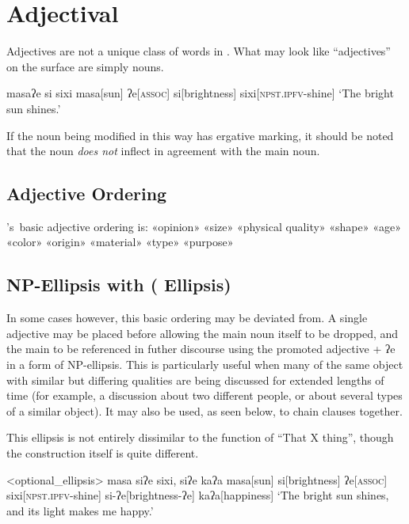 \chapter{Adjectival}\label{ch:adjectives}
Adjectives are not a unique class of words in \langname .
What may look like ``adjectives'' on the surface are simply nouns.

\ex
\begingl
\glpreamble masaʔe si sixi
\endpreamble
\nogloss{\lbrack}
masa[sun]
ʔe[\textsc{assoc}]
si[brightness]
\nogloss{\rbrack}
sixi[\textsc{npst.ipfv}-shine]
\glft `The bright sun shines.'
\endgl
\xe

If the noun being modified in this way has ergative marking, it should be noted that the noun \textit{does not} inflect in agreement with the main noun.

\section{Adjective Ordering}

\langname 's\ basic adjective ordering is: «opinion» «size» «physical quality» «shape» «age» «color» «origin» «material» «type» «purpose»

\section[\langword{ʔe} Ellipsis]{NP-Ellipsis with  ( Ellipsis)}\label{sec:ellipsis}

In some cases however, this basic ordering may be deviated from.
A single adjective may be placed before  allowing the main noun itself to be dropped, and the main to be referenced in futher discourse using the promoted adjective + ʔe in a form of NP-ellipsis.
This is particularly useful when many of the same object with similar but differing qualities are being discussed for extended lengths of time (for example, a discussion about two different people, or about several types of a similar object).
It may also be used, as seen below, to chain clauses together.

This ellipsis is not entirely dissimilar to the function of ``That X thing'', though the construction itself is quite different.

\ex<optional_ellipsis>
\begingl
\glpreamble masa siʔe sixi, siʔe kaʔa
\endpreamble
\nogloss{\lbrack}
masa[sun]
si[brightness]
ʔe[\textsc{assoc}]
\nogloss{\rbrack}
sixi[\textsc{npst.ipfv}-shine]
si-ʔe[brightness-ʔe]
kaʔa[happiness]
\glft `The bright sun shines, and its light makes me happy.'
\endgl
\xe

